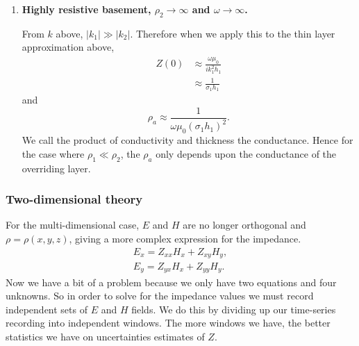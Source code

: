 \begin{enumerate}
    Recall $k = (1 - i)\left( \frac{\sigma_n \mu_0 \omega}{2} \right)^{1/2}$,
    therefore when $\sigma_1 \ll \sigma_2$, $|k_1| \ll |k_2|$ and $|k_1^2 h_1|
    \ll |k_2|$.  Employing the thin layer approximation above we find
    \begin{align*}
        Z(0) & \approx \omega \mu_0
            \left( \frac{1 + i k_2 h_1} {k_2} \right) \\
             & \approx i \omega \mu_0 h_1.
    \end{align*}
    The apparent resistivity can then be approximated by
    \begin{equation}
        \rho_a \approx \omega \mu_0 h_1^2.
    \end{equation}
    Hence when $\rho_1 \gg \rho_2$, $\rho_a$ only depends upon the thickness of
    the resistive layer above a conductive basement.  This is a somewhat
    surprising but interesting result, which implies that we are insensitive to
    the resistance of resistors.


    \item {\bf Highly resistive basement, $\rho_2 \to \infty$ and $\omega
    \to \infty$.}

    From $k$ above, $|k_1| \gg |k_2|$.  Therefore when we apply this to the thin
    layer approximation above,
    \begin{align*}
        Z(0) & \approx \frac{\omega \mu_0}{i k_1^2 h_1} \\
             & \approx \frac{1}{\sigma_1 h_1}
    \end{align*}
    and
    \begin{equation}
        \rho_a \approx \frac{1}{\omega \mu_0 (\sigma_1 h_1)^2}.
    \end{equation}
    We call the product of conductivity and thickness the conductance.  Hence
    for the case where $\rho_1 \ll \rho_2$, the $\rho_a$ only depends upon the
    conductance of the overriding layer.
\end{enumerate}


\subsubsection{Two-dimensional theory}
For the multi-dimensional case, $E$ and $H$ are no longer orthogonal and $\rho =
\rho(x,y,z)$, giving a more complex expression for the impedance.
\begin{align*}
    E_x = Z_{xx} H_x + Z_{xy} H_{y}, \\
    E_y = Z_{yx} H_x + Z_{yy} H_{y}.
\end{align*}
Now we have a bit of a problem because we only have two equations and four
unknowns.  So in order to solve for the impedance values we must record
independent sets of $E$ and $H$ fields.  We do this by dividing up our
time-series recording into independent windows.  The more windows we have, the
better statistics we have on uncertainties estimates of $Z$.

